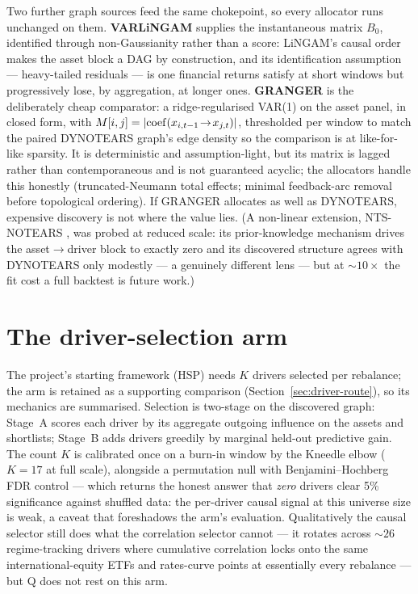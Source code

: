 Two further graph sources feed the same chokepoint, so every allocator runs
unchanged on them. \textbf{VARLiNGAM} \cite{hyvarinen2010varlingam} supplies
the instantaneous matrix $B_0$, identified through non-Gaussianity rather
than a score: LiNGAM's causal order makes the asset block a DAG by
construction, and its identification assumption --- heavy-tailed residuals ---
is one financial returns satisfy at short windows but progressively lose, by
aggregation, at longer ones. \textbf{GRANGER} is the deliberately cheap
comparator: a ridge-regularised VAR(1) on the asset panel, in closed form,
with $M[i,j] = |{\rm coef}(x_{i,t-1}\!\to\!x_{j,t})|$, thresholded per window
to match the paired DYNOTEARS graph's edge density so the comparison is at
like-for-like sparsity. It is deterministic and assumption-light, but its
matrix is lagged rather than contemporaneous and is not guaranteed acyclic;
the allocators handle this honestly (truncated-Neumann total effects; minimal
feedback-arc removal before topological ordering). If GRANGER allocates as
well as DYNOTEARS, expensive discovery is not where the value lies. (A
non-linear extension, NTS-NOTEARS \cite{sun2023ntsnotears}, was probed at
reduced scale: its prior-knowledge mechanism drives the asset$\to$driver
block to exactly zero and its discovered structure agrees with DYNOTEARS only
modestly --- a genuinely different lens --- but at ${\sim}10\times$ the fit
cost a full backtest is future work.)

\section{The driver-selection arm}
\label{sec:selection}

The project's starting framework (HSP) needs $K$ drivers selected per
rebalance; the arm is retained as a supporting comparison
(Section~\ref{sec:driver-route}), so its mechanics are summarised. Selection
is two-stage on the discovered graph: Stage~A scores each driver by its
aggregate outgoing influence on the assets and shortlists; Stage~B adds
drivers greedily by marginal held-out predictive gain. The count $K$ is
calibrated once on a burn-in window by the Kneedle elbow
\cite{satopaa2011kneedle} ($K=17$ at full scale), alongside a permutation
null with Benjamini--Hochberg FDR control \cite{benjamini1995fdr} --- which
returns the honest answer that \emph{zero} drivers clear 5\% significance
against shuffled data: the per-driver causal signal at this universe size is
weak, a caveat that foreshadows the arm's evaluation. Qualitatively the
causal selector still does what the correlation selector cannot --- it
rotates across ${\sim}26$ regime-tracking drivers where cumulative
correlation locks onto the same international-equity ETFs and rates-curve
points at essentially every rebalance --- but Q does not rest on this arm.

